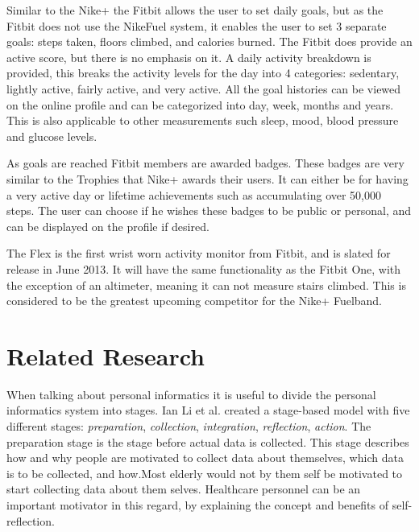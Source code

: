 Similar to the Nike+ the Fitbit allows the user to set daily goals, but as the Fitbit does not use the NikeFuel system, it enables the user to set 3 separate goals: steps taken, floors climbed, and calories burned. The Fitbit does provide an active score, but there is no emphasis on it. A daily activity breakdown is provided, this breaks the activity levels for the day into 4 categories: sedentary, lightly active, fairly active, and very active. All the goal histories can be viewed on the online profile and can be categorized into day, week, months and years. This is also applicable to other measurements such sleep, mood, blood pressure and glucose levels. 


As goals are reached Fitbit members are awarded badges. These badges are very similar to the Trophies that Nike+ awards their users. It can either be for having a very active day or lifetime achievements such as accumulating over 50,000 steps. The user can choose if he wishes these badges to be public or personal, and can be displayed on the profile if desired.

The Flex is the first wrist worn activity monitor from Fitbit, and is slated for release in June 2013. It will have the same functionality as the Fitbit One, with the exception of an altimeter, meaning it can not measure stairs climbed. This is considered to be the greatest upcoming competitor for the Nike+ Fuelband.


\section{Related Research}
When talking about personal informatics it is useful to divide the personal informatics system into stages. Ian Li et al. created a stage-based model \cite{li2010} with five different stages: \emph{preparation}, \emph{collection}, \emph{integration}, \emph{reflection}, \emph{action}. The preparation stage is the stage before actual data is collected. This stage describes how and why people are motivated to collect data about themselves, which data is to be collected, and how.Most elderly would not by them self be motivated to start collecting data about them selves. Healthcare personnel can be an important motivator in this regard, by explaining the concept and benefits of self-reflection. %

